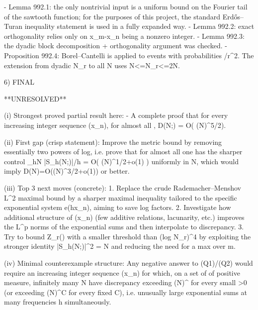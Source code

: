 - Lemma 992.1: the only nontrivial input is a uniform bound on the Fourier tail of the
  sawtooth function; for the purposes of this project, the standard Erd\H{o}s--Turan
  inequality statement is used in a fully expanded way.
- Lemma 992.2: exact orthogonality relies only on x_m-x_n being a nonzero integer.
- Lemma 992.3: the dyadic block decomposition + orthogonality argument was checked.
- Proposition 992.4: Borel--Cantelli is applied to events with probabilities /r^2.
  The extension from dyadic N_r to all N uses N<=N_r<=2N.

6) FINAL

**UNRESOLVED**

(i) Strongest proved partial result here:
    - A complete proof that for every increasing integer sequence (x_n), for almost all \alpha,
      D(N;\alpha) = O( (\log N)^{5/2}).

(ii) First gap (crisp statement):
    Improve the metric bound by removing essentially two powers of log, i.e. prove that for
    almost all \alpha one has the sharper control
      \sum_{h\le N} |S_h(N;\alpha)|/h = O(  (\log N)^{1/2+o(1)} )
    uniformly in N, which would imply D(N)=O((\log N)^{3/2+o(1)}) or better.

(iii) Top 3 next moves (concrete):
    1. Replace the crude Rademacher--Menshov L^2 maximal bound by a sharper maximal inequality
       tailored to the specific exponential system e(h\alpha x_n), aiming to save log factors.
    2. Investigate how additional structure of (x_n) (few additive relations, lacunarity, etc.)
       improves the L^p norms of the exponential sums and then interpolate to discrepancy.
    3. Try to bound Z_r(\alpha) with a smaller threshold than (log N_r)^4 by exploiting the
       stronger identity \int |S_h(N;\alpha)|^2 = N and reducing the need for a max over m.

(iv) Minimal counterexample structure:
    Any negative answer to (Q1)/(Q2) would require an increasing integer sequence (x_n) for
    which, on a set of \alpha of positive measure, infinitely many N have discrepancy exceeding
    (\log N)^{\varepsilon} for every small \varepsilon>0 (or exceeding
    (\log\log N)^C for every fixed C), i.e. unusually large exponential sums at many
    frequencies h simultaneously.
